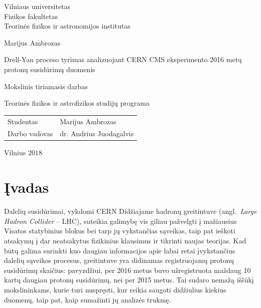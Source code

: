 \documentclass[a4paper, 12pt]{article}
\begin{document}
\linenumbers

\begin{titlepage}
\centering
{\large Vilniaus universitetas \\ Fizikos fakultetas \\ Teorinės fizikos ir astronomijos institutas \par}
\vspace{3.5cm}
{\Large Marijus Ambrozas \par}
\vspace{0.3cm}
{\LARGE Drell-Yan proceso tyrimas analizuojant CERN CMS eksperimento 2016 metų protonų susidūrimų duomenis \par}
\vspace{0.8cm}
{\large Mokslinis tiriamasis darbas \par}
\vspace{0.8cm}
{\large Teorinės fizikos ir astrofizikos studijų programa \par}
\vspace{3.5cm}
{\large \begin{tabular*}{0.9\textwidth}{@{\extracolsep{\fill}}ll}
Studentas & Marijus Ambrozas\tabularnewline[0.5cm]
Darbo vadovas & dr. Andrius Juodagalvis\tabularnewline[0.5cm]
\end{tabular*} \par}
\vspace{4cm}
{\large Vilnius $2018$\par}
\end{titlepage}


\clearpage
\addtocounter{page}{1}
\tableofcontents
\clearpage

\section*{Įvadas} 

Dalelių susidūrimai, vykdomi CERN Didžiajame hadronų greitintuve (angl.\
\textit{Large Hadron Collider} -- LHC), suteikia galimybę vis giliau pažvelgti į mažiausius
Visatos statybinius blokus bei tarp jų vykstančias sąveikas, taip pat ieškoti atsakymų
į dar neatsakytus fizikinius klausimus ir tikrinti naujas teorijas.
Kad būtų galima surinkti kuo daugiau informacijos apie labai retai įvykstančius
dalelių sąveikos procesus, greitintuve yra didinamas registruojamų protonų susidūrimų
skaičius: pavyzdžiui, per 2016 metus buvo užregistruota maždaug 10 kartų daugiau protonų
susidūrimų, nei per 2015 metus.
Tai sudaro nemažą iššūkį mokslininkams, kurie turi nuspręsti, kur reikia saugoti
didžiulius kiekius duomenų, taip pat, kaip sumažinti jų analizės trukmę.
\end{document}
